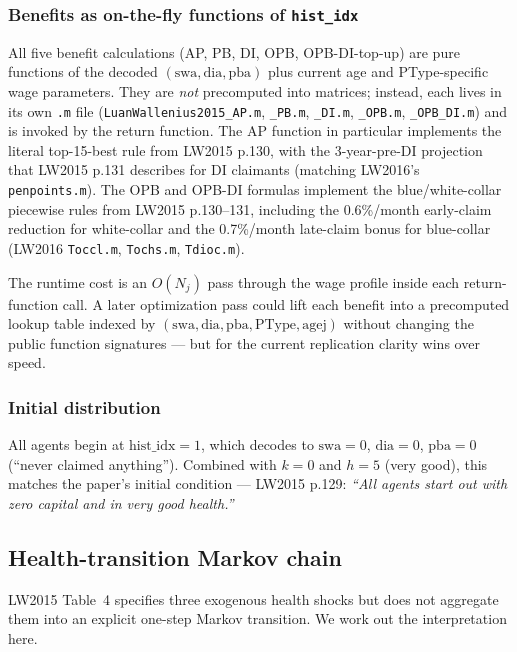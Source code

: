 \subsubsection{Benefits as on-the-fly functions of \texttt{hist\_idx}}

All five benefit calculations (AP, PB, DI, OPB, OPB-DI-top-up) are pure functions of the decoded $(\text{swa}, \text{dia}, \text{pba})$ plus current age and PType-specific wage parameters. They are \emph{not} precomputed into matrices; instead, each lives in its own \verb|.m| file (\verb|LuanWallenius2015_AP.m|, \verb|_PB.m|, \verb|_DI.m|, \verb|_OPB.m|, \verb|_OPB_DI.m|) and is invoked by the return function. The AP function in particular implements the literal top-15-best rule from LW2015 p.130, with the 3-year-pre-DI projection that LW2015 p.131 describes for DI claimants (matching LW2016's \verb|penpoints.m|). The OPB and OPB-DI formulas implement the blue/white-collar piecewise rules from LW2015 p.130--131, including the 0.6\%/month early-claim reduction for white-collar and the 0.7\%/month late-claim bonus for blue-collar (LW2016 \verb|Toccl.m|, \verb|Tochs.m|, \verb|Tdioc.m|).

The runtime cost is an $O(N_j)$ pass through the wage profile inside each return-function call. A later optimization pass could lift each benefit into a precomputed lookup table indexed by $(\text{swa}, \text{dia}, \text{pba}, \text{PType}, \text{agej})$ without changing the public function signatures --- but for the current replication clarity wins over speed.

\subsubsection{Initial distribution}

All agents begin at $\text{hist\_idx} = 1$, which decodes to $\text{swa} = 0$, $\text{dia} = 0$, $\text{pba} = 0$ (``never claimed anything''). Combined with $k = 0$ and $h = 5$ (very good), this matches the paper's initial condition --- LW2015 p.129: \emph{``All agents start out with zero capital and in very good health.''}


\subsection{Health-transition Markov chain}\label{sec:health}

LW2015 Table~4 specifies three exogenous health shocks but does not aggregate them into an explicit one-step Markov transition. We work out the interpretation here.

